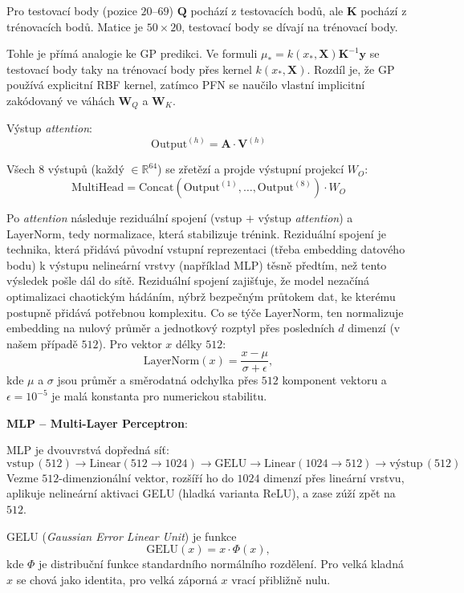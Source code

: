Pro testovací body (pozice $20$–$69$) $\mathbf{Q}$ pochází z testovacích bodů, ale $\mathbf{K}$ pochází z trénovacích bodů. Matice je $50 \times 20$, testovací body se dívají na trénovací body.

Tohle je přímá analogie ke GP predikci. Ve formuli $\mu_* = k(x_*, \mathbf{X}) \mathbf{K}^{-1} \mathbf{y}$ se testovací body taky  na trénovací body přes kernel $k(x_*, \mathbf{X})$. Rozdíl je, že GP používá explicitní RBF kernel, zatímco PFN se naučilo vlastní implicitní  zakódovaný ve váhách $\mathbf{W}_Q$ a $\mathbf{W}_K$.

Výstup \emph{attention}:
$$\text{Output}^{(h)} = \mathbf{A} \cdot \mathbf{V}^{(h)}$$

Všech $8$ výstupů (každý $\in \mathbb{R}^{64}$) se zřetězí a projde výstupní projekcí $W_O$:
$$\text{MultiHead} = \text{Concat}(\text{Output}^{(1)}, \dots, \text{Output}^{(8)}) \cdot W_O$$

Po \emph{attention} následuje reziduální spojení (vstup $+$ výstup \emph{attention}) a LayerNorm, tedy normalizace, která stabilizuje trénink.
Reziduální spojení je technika, která přidává původní vstupní reprezentaci (třeba embedding datového bodu) k výstupu nelineární vrstvy (například MLP) těsně předtím, než tento výsledek pošle dál do sítě.
Reziduální spojení zajišťuje, že model nezačíná optimalizaci chaotickým hádáním, nýbrž bezpečným průtokem dat, ke kterému postupně přidává potřebnou komplexitu.
Co se týče LayerNorm, ten normalizuje embedding na nulový průměr a jednotkový rozptyl přes posledních $d$ dimenzí (v našem případě $512$). 
Pro vektor $x$ délky $512$:
$$\text{LayerNorm}(x) = \frac{x - \mu}{\sigma + \epsilon},$$
kde $\mu$ a $\sigma$ jsou průměr a směrodatná odchylka přes $512$ komponent vektoru a $\epsilon = 10^{-5}$ je malá konstanta pro numerickou stabilitu.

\textbf{MLP – Multi-Layer Perceptron}:

MLP je dvouvrstvá dopředná síť:
$$\text{vstup}\,(512) \to \text{Linear}(512 \to 1024) \to \text{GELU} \to \text{Linear}(1024 \to 512) \to \text{výstup}\,(512)$$
Vezme $512$-dimenzionální vektor, rozšíří ho do $1024$ dimenzí přes lineární vrstvu, aplikuje nelineární aktivaci GELU (hladká varianta ReLU), a zase zúží zpět na $512$.

GELU (\emph{Gaussian Error Linear Unit}) je funkce
$$\text{GELU}(x) = x \cdot \Phi(x),$$
kde $\Phi$ je distribuční funkce standardního normálního rozdělení.
Pro velká kladná $x$ se chová jako identita, pro velká záporná $x$ vrací přibližně nulu.

